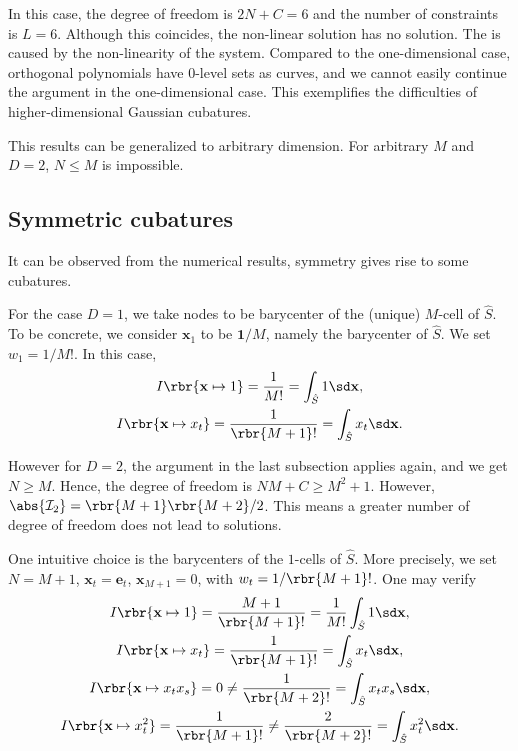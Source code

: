 \documentclass[english, nochinese]{pnote}
\begin{document}
In this case, the degree of freedom is $ 2 N + C = 6 $ and the number of constraints is $ L = 6 $. Although this coincides, the non-linear solution has no solution. The is caused by the non-linearity of the system. Compared to the one-dimensional case, orthogonal polynomials have $0$-level sets as curves, and we cannot easily continue the argument in the one-dimensional case. This exemplifies the difficulties of higher-dimensional Gaussian cubatures.

This results can be generalized to arbitrary dimension. For arbitrary $M$ and $ D = 2 $, $ N \le M $ is impossible.

\subsection{Symmetric cubatures}

It can be observed from the numerical results, symmetry gives rise to some cubatures.

For the case $ D = 1 $, we take nodes to be barycenter of the (unique) $M$-cell of $\hat{S}$. To be concrete, we consider $\mathbf{x}_1$ to be $ \mathbf{1} / M $, namely the barycenter of $\hat{S}$. We set $ w_1 = 1 / M ! $. In this case,
\begin{gather}
I \rbr{ \mathbf{x} \mapsto 1 } = \frac{1}{ M ! } = \int_{\hat{S}} 1 \sd \mathbf{x}, \\
I \rbr{ \mathbf{x} \mapsto x_t } = \frac{1}{ \rbr{ M + 1 } ! } = \int_{\hat{S}} x_t \sd \mathbf{x}.
\end{gather}

However for $ D = 2 $, the argument in the last subsection applies again, and we get $ N \ge M $. Hence, the degree of freedom is $ N M + C \ge M^2 + 1 $. However, $ \abs{\mathcal{I}_2} = \rbr{ M + 1 } \rbr{ M + 2 } / 2 $. This means a greater number of degree of freedom does not lead to solutions.

One intuitive choice is the barycenters of the $1$-cells of $\hat{S}$. More precisely, we set $ N = M + 1 $, $ \mathbf{x}_t = \mathbf{e}_t $, $ \mathbf{x}_{ M + 1 } = 0 $, with $ w_t = 1 / \rbr{ M + 1 } ! $. One may verify
\begin{gather}
I \rbr{ \mathbf{x} \mapsto 1 } = \frac{ M + 1 }{ \rbr{ M + 1 } ! } = \frac{1}{ M ! } \int_{\hat{S}} 1 \sd \mathbf{x}, \\
I \rbr{ \mathbf{x} \mapsto x_t } = \frac{1}{ \rbr{ M + 1 } ! } = \int_{\hat{S}} x_t \sd \mathbf{x}, \\
I \rbr{ \mathbf{x} \mapsto x_t x_s } = 0 \neq \frac{1}{ \rbr{ M + 2 } ! } = \int_{\hat{S}} x_t x_s \sd \mathbf{x}, \\
I \rbr{ \mathbf{x} \mapsto x_t^2 } = \frac{1}{ \rbr{ M + 1 } ! } \neq \frac{2}{ \rbr{ M + 2 } ! } = \int_{\hat{S}} x_t^2 \sd \mathbf{x}.
\end{gather}
\end{document}
